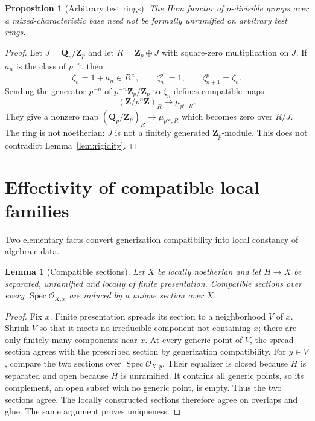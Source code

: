 \documentclass[11pt]{article}
\newtheorem{proposition}[theorem]{Proposition}
\newtheorem{lemma}[theorem]{Lemma}
\theoremstyle{definition}\newtheorem{definition}[theorem]{Definition}
\theoremstyle{remark}\newtheorem{remark}[theorem]{Remark}
\newcommand{\Spec}{\operatorname{Spec}}
\newcommand{\OO}{\mathcal O}
\begin{document}
\begin{proposition}[Arbitrary test rings]\label{prop:nonnoetherian}
The Hom functor of $p$-divisible groups over a mixed-characteristic base need not be formally unramified on arbitrary test rings.
\end{proposition}
\begin{proof}
Let $J=\mathbf Q_p/\mathbf Z_p$ and let $R=\mathbf Z_p\oplus J$ with square-zero multiplication on $J$. If $a_n$ is the class of $p^{-n}$, then
\[
 \zeta_n=1+a_n\in R^\times,\qquad
 \zeta_n^{p^n}=1,\qquad \zeta_{n+1}^{p}=\zeta_n.
\]
Sending the generator $p^{-n}$ of $p^{-n}\mathbf Z_p/\mathbf Z_p$ to $\zeta_n$ defines compatible maps
\[
 (\mathbf Z/p^n\mathbf Z)_R\longrightarrow\mu_{p^n,R}.
\]
They give a nonzero map $(\mathbf Q_p/\mathbf Z_p)_R\to\mu_{p^\infty,R}$ which becomes zero over $R/J$. The ring is not noetherian: $J$ is not a finitely generated $\mathbf Z_p$-module. This does not contradict Lemma~\ref{lem:rigidity}.
\end{proof}

\section{Effectivity of compatible local families}

Two elementary facts convert generization compatibility into local constancy of algebraic data.

\begin{lemma}[Compatible sections]\label{lem:sections}
Let $X$ be locally noetherian and let $H\to X$ be separated, unramified and locally of finite presentation. Compatible sections over every $\Spec\OO_{X,x}$ are induced by a unique section over $X$.
\end{lemma}
\begin{proof}
Fix $x$. Finite presentation spreads its section to a neighborhood $V$ of $x$. Shrink $V$ so that it meets no irreducible component not containing $x$; there are only finitely many components near $x$. At every generic point of $V$, the spread section agrees with the prescribed section by generization compatibility. For $y\in V$, compare the two sections over $\Spec\OO_{X,y}$. Their equalizer is closed because $H$ is separated and open because $H$ is unramified. It contains all generic points, so its complement, an open subset with no generic point, is empty. Thus the two sections agree. The locally constructed sections therefore agree on overlaps and glue. The same argument proves uniqueness.
\end{proof}
\end{document}
